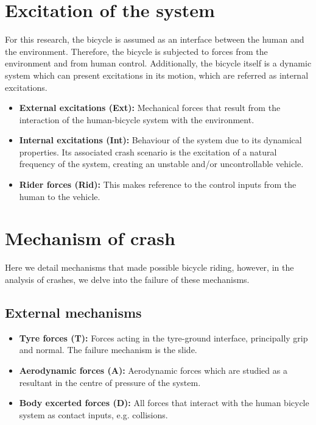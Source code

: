 \documentclass{article}
\begin{document}
\section{Excitation of the system}

For this research, the bicycle is assumed as an interface between the human and the environment.
%
Therefore, the bicycle is subjected to forces from the environment and from human control.
%
Additionally, the bicycle itself is a dynamic system which can present excitations in its motion, which are referred as internal excitations.


\begin{itemize}
    \item \textbf{External excitations (Ext):} Mechanical forces that result from the interaction of the human-bicycle system with the environment.
    \item \textbf{Internal excitations (Int):} Behaviour of the system due to its dynamical properties.
        Its associated crash scenario is the excitation of a natural frequency of the system, creating an unstable and/or uncontrollable vehicle.
    \item \textbf{Rider forces (Rid):} This makes reference to the control inputs from the human to the vehicle.
\end{itemize}



\section{Mechanism of crash}

Here we detail mechanisms that made possible bicycle riding, however, in the analysis of crashes, we delve into the failure of these mechanisms.

\subsection{External mechanisms}
\begin{itemize}
    \item \textbf{Tyre forces (T):} Forces acting in the tyre-ground interface, principally grip and normal. The failure mechanism is the slide.
    \item \textbf{Aerodynamic forces (A):} Aerodynamic forces which are studied as a resultant in the centre of pressure of the system.
    \item \textbf{Body excerted forces (D):} All forces that interact with the human bicycle system as contact inputs, e.g. collisions.
\end{itemize}
\end{document}
